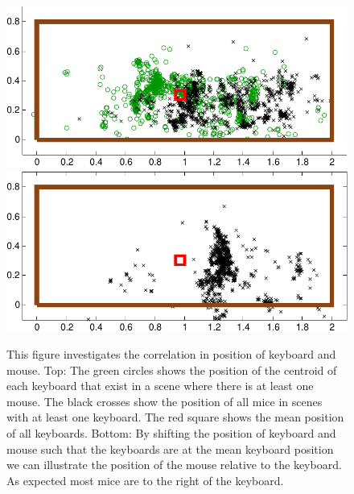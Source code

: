 \documentclass[letterpaper, 10 pt, conference]{ieeeconf}  %
\begin{document}
\begin{figure}
\begin{center}
\includegraphics[width=0.8\linewidth]{keyboard_mouse_raw-crop}
\includegraphics[width=0.8\linewidth]{keyboard_mouse-crop}
\end{center}
\label{fig:scatter-keyboard-mouse}
\caption{This figure investigates the correlation in position of keyboard and mouse. Top: The green circles shows the position of the centroid of each keyboard that exist in a scene where there is at least one mouse. The black crosses show the position of all mice in scenes with at least one keyboard. The red square shows the mean position of all keyboards. Bottom: By shifting the position of keyboard and mouse such that the keyboards are at the mean keyboard position we can illustrate the position of the mouse relative to the keyboard. As expected most mice are to the right of the keyboard.} 
\end{figure}

\end{document}
